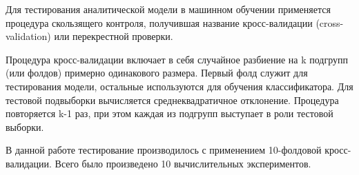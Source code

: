% 
% 
% 
% 
% 

Для тестирования аналитической модели в машинном обучении применяется процедура скользящего
контроля, получившая название кросс-валидации (cross-validation) или перекрестной проверки.~\cite{crossval}

Процедура кросс-валидации включает в себя случайное разбиение на k подгрупп (или фолдов) примерно
одинакового размера. Первый фолд служит для тестирования модели, остальные используются для обучения
классификатора. Для тестовой подвыборки вычисляется среднеквадратичное отклонение. Процедура повторяется k-1
раз, при этом каждая из подгрупп выступает в роли тестовой выборки.

В данной работе тестирование производилось с применением 10-фолдовой кросс-валидации. Всего было произведено
10 вычислительных экспериментов.
